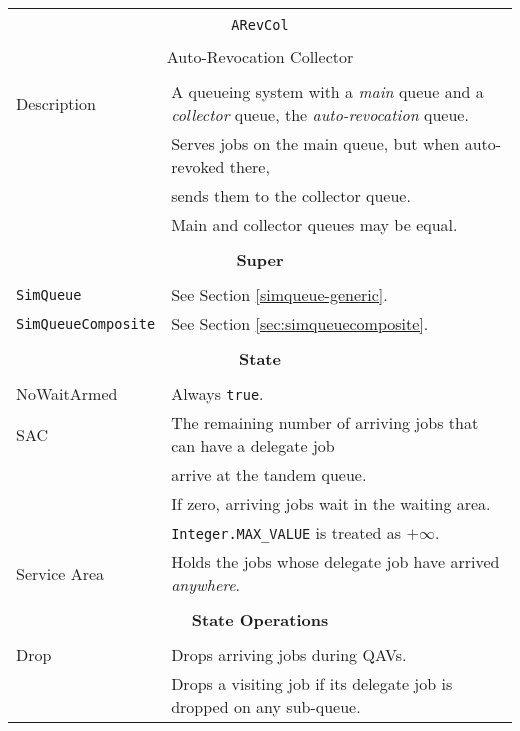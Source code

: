 \begin{tabular}{|l|l|}
	\hline
	\multicolumn{2}{|c|}{} \\
	\multicolumn{2}{|c|}{\lstinline[basicstyle=\large]{ARevCol}} \\
	\multicolumn{2}{|c|}{} \\
	\multicolumn{2}{|c|}{Auto-Revocation Collector} \\
	\multicolumn{2}{|c|}{} \\
	\hline
	Description & A queueing system with a {\em main\/} queue
	and a {\em collector\/} queue, the {\em auto-revocation\/} queue.  \\
	&
	Serves jobs on the main queue, but when auto-revoked there, \\
	& sends them to the collector queue.\\
	& Main and collector queues may be equal. \\
	\hline
	\multicolumn{2}{|c|}{} \\
	\multicolumn{2}{|c|}{\bf Super} \\
	\multicolumn{2}{|c|}{} \\
	\hline
	\lstinline|SimQueue| & See Section \ref{simqueue-generic}. \\
	\lstinline|SimQueueComposite| & See Section \ref{sec:simqueuecomposite}. \\
	\hline
	\multicolumn{2}{|c|}{} \\
	\multicolumn{2}{|c|}{\bf State} \\
	\multicolumn{2}{|c|}{} \\
	\hline
	NoWaitArmed & Always \lstinline|true|. \\
	\hline
	SAC & The remaining number of arriving jobs that can have a delegate job \\
	& arrive at the tandem queue. \\
	& If zero, arriving jobs wait in the waiting area. \\
	& \lstinline|Integer.MAX_VALUE| is treated as $+\infty$. \\
	\hline
	Service Area & Holds the jobs whose delegate job have arrived {\em anywhere}. \\
	\hline
	\multicolumn{2}{|c|}{} \\
	\multicolumn{2}{|c|}{\bf State Operations} \\
	\multicolumn{2}{|c|}{} \\
	\hline
	Drop & Drops arriving jobs during QAVs. \\
	& Drops a visiting job if its delegate job is dropped on any sub-queue. \\

\end{tabular}
